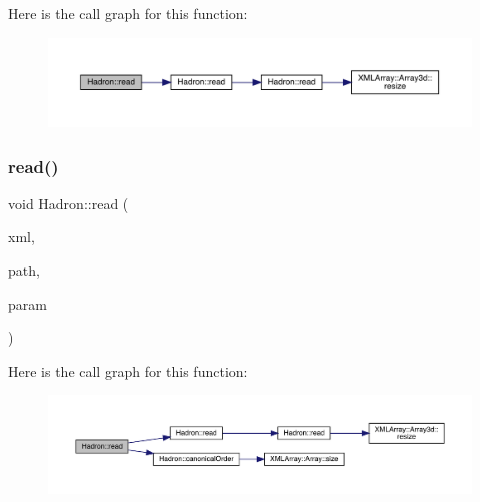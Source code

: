 Here is the call graph for this function\+:
\nopagebreak
\begin{figure}[H]
\begin{center}
\leavevmode
\includegraphics[width=350pt]{d1/daf/namespaceHadron_a35b28e298745916c37daa929a874e099_cgraph}
\end{center}
\end{figure}
\mbox{\label{namespaceHadron_ab955c28b5566e0df089a26a611d4bf03}} 
\subsubsection{\texorpdfstring{read()}{read()}\hspace{0.1cm}{\footnotesize\ttfamily [32/94]}}
{\footnotesize\ttfamily void Hadron\+::read (\begin{DoxyParamCaption}\item[{\mbox{\hyperlink{classADATXML_1_1XMLReader}{X\+M\+L\+Reader}} \&}]{xml,  }\item[{const std\+::string \&}]{path,  }\item[{\mbox{\hyperlink{structHadron_1_1KeyHadronNPartIrrepOp__t_1_1CGPair__t_1_1Slot__t}{Key\+Hadron\+N\+Part\+Irrep\+Op\+\_\+t\+::\+C\+G\+Pair\+\_\+t\+::\+Slot\+\_\+t}} \&}]{param }\end{DoxyParamCaption})}

Here is the call graph for this function\+:
\nopagebreak
\begin{figure}[H]
\begin{center}
\leavevmode
\includegraphics[width=350pt]{d1/daf/namespaceHadron_ab955c28b5566e0df089a26a611d4bf03_cgraph}
\end{center}
\end{figure}
\mbox{\label{namespaceHadron_a067d20ab6ec9071306d6db3a7e7cb4fd}} 
